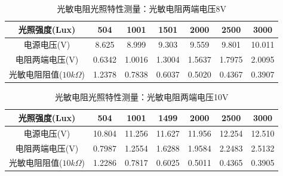 \documentclass{ctexart}
\begin{document}
\begin{table}[H]
  \centering
  \begin{tabular}{|c|c|c|c|c|c|c|}
    \hline
    光照强度(Lux) &504&1001&1501&2000&2500&3000\\\hline
    电源电压(V) &8.625&8.999&9.303&9.559&9.801&10.011\\\hline
    电阻两端电压(V) &0.6342&1.0016&1.3004&1.5637&1.7975&2.0095\\\hline
    光敏电阻阻值($10k\Omega$) & 1.2378&0.7838&0.6037&0.5020&0.4367&0.3907\\\hline
  \end{tabular}
  \caption{光敏电阻光照特性测量：光敏电阻两端电压8V}
\end{table}

\begin{table}[H]
  \centering
  \begin{tabular}{|c|c|c|c|c|c|c|}
    \hline
    光照强度(Lux) &504&1001&1499&2000&2500&3000\\\hline
    电源电压(V) &10.804&11.256&11.627&11.956&12.254&12.510\\\hline
    电阻两端电压(V) &0.7987&1.2554&1.6288&1.9584&2.2483&2.5132\\\hline
    光敏电阻阻值($10k\Omega$) & 1.2286&0.7817&0.6025&0.5011&0.4365&0.3905\\\hline
  \end{tabular}
  \caption{光敏电阻光照特性测量：光敏电阻两端电压10V}
\end{table}
\end{document}
